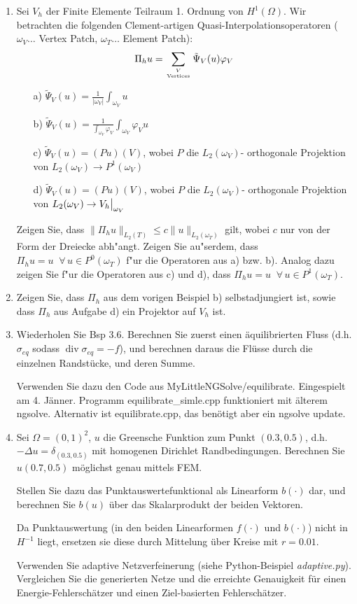\documentclass[11pt,a4paper]{report}
\newcommand\restr[2]{{%
  \left.\kern-\nulldelimiterspace %
  #1 %
  \vphantom{\big|} %
  \right|_{#2} %
  }}
\begin{document}
\begin{enumerate}
\item Sei $V_h$ der Finite Elemente Teilraum 1. Ordnung von
  $H^1(\Omega)$. Wir betrachten die folgenden Clement-artigen
  Quasi-Interpolationsoperatoren ($\omega_V\ldots$ Vertex Patch, $\omega_T\ldots$ Element Patch):
$$\Pi_hu = \sum\limits_{V \atop \text{Vertices}}\tilde{\Psi}_V(u) \varphi_V $$
\begin{itemize}
\item[a)] $\tilde{\Psi}_V(u) = \frac{1}{|\omega_V|}\int_{\omega_V}u$					
\item[b)] $\tilde{\Psi}_V(u) = \frac{1}{\int_{\omega_V}\varphi_V}\int_{\omega_V}\varphi_V u$
\item[c)] $\tilde{\Psi}_V(u) = (Pu)(V)$, wobei $P$ die $L_2(\omega_V)$- orthogonale Projektion von $L_2(\omega_V)\rightarrow P^1(\omega_V)$
\item[d)] $\tilde{\Psi}_V(u) = (Pu)(V)$, wobei $P$ die $L_2(\omega_V)$- orthogonale Projektion von $L_2(\omega_V)\rightarrow \restr{V_h}{\omega_V}$
\end{itemize}
Zeigen Sie, dass $\|\Pi_h u \|_{L_2(T)} \leq c\|u\|_{L_2(\omega_T)}$
gilt, wobei $c$ nur von der Form der Dreiecke abh"angt.
Zeigen Sie au"serdem, dass $\Pi_hu = u\;\;\forall\,u\in P^0(\omega_T)$ f"ur die Operatoren aus a) bzw. b). Analog dazu zeigen Sie f"ur die Operatoren aus c) und d), dass $\Pi_hu = u\;\;\forall\,u\in P^1(\omega_T)$.

\item Zeigen Sie, dass $\Pi_h$ aus dem vorigen Beispiel b)
  selbstadjungiert ist, sowie dass $\Pi_h$ aus Aufgabe d) ein Projektor auf $V_h$ ist.



\item Wiederholen Sie Bsp 3.6. Berechnen Sie zuerst einen
  \"aquilibrierten Fluss (d.h. $\sigma_{eq}$ sodass $\operatorname{div}
  \sigma_{eq} = -f$), und berechnen daraus die Fl\"usse durch die
  einzelnen Randst\"ucke, und deren Summe.

Verwenden Sie dazu den Code aus MyLittleNGSolve/equilibrate. 
Eingespielt am 4. J\"anner. Programm equilibrate\_simle.cpp
funktioniert mit \"alterem ngsolve. Alternativ ist equilibrate.cpp,
das ben\"otigt aber ein ngsolve update.

\item Sei $\Omega = (0,1)^2$, $u$ die Greensche Funktion zum Punkt
  $(0.3, 0.5)$, d.h. $-\Delta u = \delta_{(0.3,0.5)}$ mit homogenen Dirichlet Randbedingungen. Berechnen Sie
  $u(0.7, 0.5)$ m\"oglichst genau mittels FEM. 

Stellen Sie dazu das Punktauswertefunktional als Linearform $b(\cdot)$ dar, und
berechnen Sie $b(u)$ \"uber das Skalarprodukt der beiden Vektoren.

Da  Punktauswertung (in den beiden Linearformen $f(\cdot)$ und $b(\cdot)$) nicht in $H^{-1}$
liegt, ersetzen sie diese durch Mittelung \"uber Kreise mit $r = 0.01$.

Verwenden Sie adaptive Netzverfeinerung (siehe Python-Beispiel {\em
  adaptive.py}). Vergleichen Sie die generierten Netze und die
erreichte Genauigkeit f\"ur einen Energie-Fehlersch\"atzer und
einen Ziel-basierten Fehlersch\"atzer.
\end{enumerate}
\end{document}
